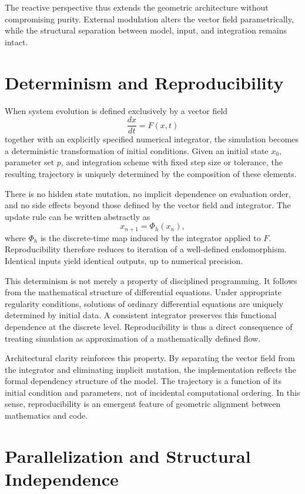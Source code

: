 \documentclass[12pt]{book}
\begin{document}
The reactive perspective thus extends the geometric architecture
without compromising purity. External modulation alters the vector
field parametrically, while the structural separation between model,
input, and integration remains intact.

\section{Determinism and Reproducibility}

When system evolution is defined exclusively by a vector field
\[
\frac{dx}{dt} = F(x,t)
\]
together with an explicitly specified numerical integrator, the
simulation becomes a deterministic transformation of initial
conditions. Given an initial state $x_0$, parameter set $p$, and
integration scheme with fixed step size or tolerance, the resulting
trajectory is uniquely determined by the composition of these
elements.

There is no hidden state mutation, no implicit dependence on
evaluation order, and no side effects beyond those defined by the
vector field and integrator. The update rule can be written abstractly
as
\[
x_{n+1} = \Phi_h(x_n),
\]
where $\Phi_h$ is the discrete-time map induced by the integrator
applied to $F$. Reproducibility therefore reduces to iteration of a
well-defined endomorphism. Identical inputs yield identical outputs,
up to numerical precision.

This determinism is not merely a property of disciplined programming.
It follows from the mathematical structure of differential equations.
Under appropriate regularity conditions, solutions of ordinary
differential equations are uniquely determined by initial data. A
consistent integrator preserves this functional dependence at the
discrete level. Reproducibility is thus a direct consequence of
treating simulation as approximation of a mathematically defined
flow.

Architectural clarity reinforces this property. By separating the
vector field from the integrator and eliminating implicit mutation,
the implementation reflects the formal dependency structure of the
model. The trajectory is a function of its initial condition and
parameters, not of incidental computational ordering. In this sense,
reproducibility is an emergent feature of geometric alignment between
mathematics and code.

\section{Parallelization and Structural Independence}
\end{document}
